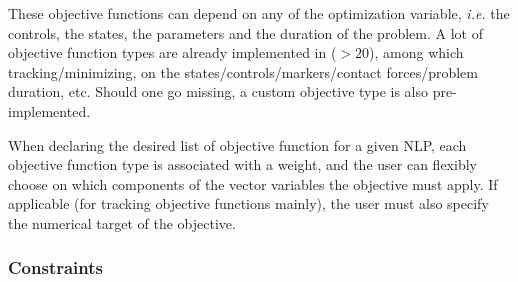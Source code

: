 These objective functions can depend on any of the optimization variable, \textit{i.e.} the controls, the states, the parameters and the duration of the problem. A lot of objective function types are already implemented in \bioptim ($>\!20$), among which tracking/minimizing, on the states/controls/markers/contact forces/problem duration, etc. Should one go missing, a custom objective type is also pre-implemented.

When declaring the desired list of objective function for a given NLP, each objective function type is associated with a weight, and the user can flexibly choose on which components of the vector variables the objective must apply. If applicable (for tracking objective functions mainly), the user must also specify the numerical target of the objective.

\subsubsection{Constraints}